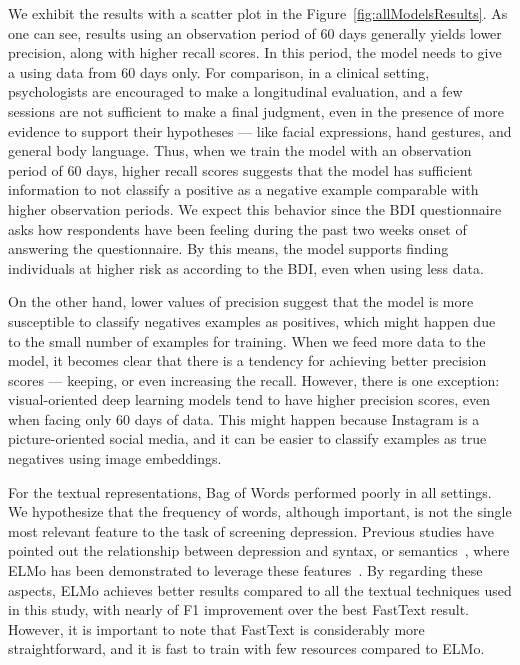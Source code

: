 \documentclass[letterpaper]{article} \usepackage{aaai20}  \usepackage{times}  \usepackage{helvet} \usepackage{courier}  \usepackage[hyphens]{url}  \usepackage{graphicx} \urlstyle{rm} \def\UrlFont{\rm}  \usepackage{graphicx}  \frenchspacing  \setlength{\pdfpagewidth}{8.5in}  \setlength{\pdfpageheight}{11in}  \usepackage[final]{changes}
\begin{document}
We exhibit the results with a scatter plot in the Figure~\ref{fig:allModelsResults}. As one can see, results using an observation period of 60 days generally yields lower precision, along with higher recall scores. In this period, the model needs to give a  using data from 60 days only. For comparison, in a clinical setting, psychologists are encouraged to make a longitudinal evaluation, and a few sessions are not sufficient to make a final judgment, even in the presence of more evidence to support their hypotheses --- like facial expressions, hand gestures, and general body language. Thus, when we train the model with an observation period of 60 days, higher recall scores suggests that the model has sufficient information to not classify a positive as a negative example comparable with higher observation periods. We expect this behavior since the BDI questionnaire asks how respondents have been feeling during the past two weeks onset of answering the questionnaire. By this means, the model supports finding individuals at higher risk as according to the BDI, even when using less data.

On the other hand, lower values of precision suggest that the model is more susceptible to classify negatives examples as positives, which might happen due to the small number of examples for training. When we feed more data to the model, it becomes clear that there is a tendency for achieving better precision scores --- keeping, or even increasing the recall. However, there is one exception: visual-oriented deep learning models tend to have higher precision scores, even when facing only 60 days of data. This might happen because Instagram is a picture-oriented social media, and it can be easier to classify examples as true negatives using image embeddings.

For the textual representations, Bag of Words performed poorly in all settings. We hypothesize that the frequency of words, although important, is not the single most relevant feature to the task of screening depression. Previous studies have pointed out the relationship between depression and syntax, or semantics~\cite{morales2018linguistically,de2013predicting}, where ELMo has been demonstrated to leverage these features~\cite{peters2018deep}. By regarding these aspects, ELMo achieves better results compared to all the textual techniques used in this study, with nearly  of F1 improvement over the best FastText result. However, it is important to note that FastText is considerably more straightforward, and it is fast to train with few resources compared to ELMo.
\end{document}
